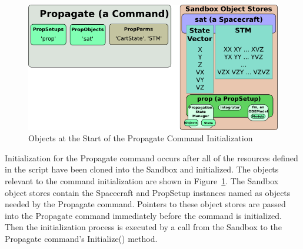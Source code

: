 \documentclass[10pt]{article}
\begin{document}
\begin{figure}[htb]
   \centering
   \includegraphics[371,186]{Images/PersistenceStart.png}
   \caption{Objects at the Start of the Propagate Command Initialization}
   \label{fig:PersistenceStart}
\end{figure}

Initialization for the Propagate command occurs after all of the resources defined in the script
have been cloned into the Sandbox and initialized.  The objects relevant to the command
initialization are shown in Figure~\ref{fig:PersistenceStart}.  The Sandbox object stores contain
the Spacecraft and PropSetup instances named as objects needed by the Propagate command.  Pointers
to these object stores are passed into the Propagate command immediately before the command is
initialized.  Then the initialization process is executed by a call from the Sandbox to the
Propagate command's Initialize() method.
\end{document}
